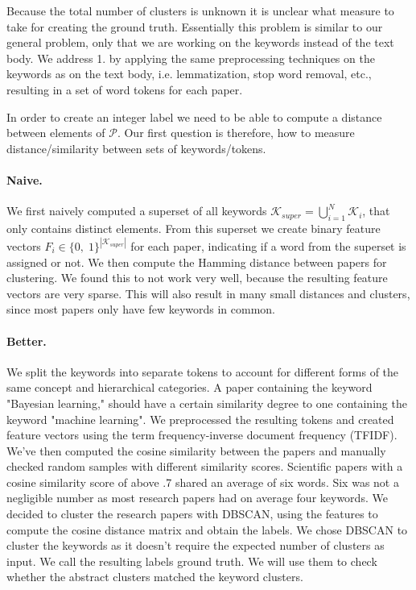 Because the total number of clusters is unknown it is unclear what measure to take for creating the ground truth. Essentially this problem is similar to our general problem, only that we are working on the keywords instead of the text body. We address 1. by applying the same preprocessing techniques on the keywords as on the text body, i.e. lemmatization, stop word removal, etc., resulting in a set of word tokens for each paper.

In order to create an integer label we need to be able to compute a distance between elements of $ \mathcal{P} $. Our first question is therefore, how to measure distance/similarity between sets of keywords/tokens. 

\paragraph{Naive.}
We first naively computed a superset of all keywords $ \mathcal{K}_{super} = \bigcup_{i=1}^{N} \mathcal{K}_{i} $, that only contains distinct elements. From this superset we create binary feature vectors $ F_{i} \in \{0,\; 1 \}^{|\mathcal{K}_{super}|} $ for each paper, indicating if a word from the superset is assigned or not. We then compute the Hamming distance between papers for clustering. We found this to not work very well, because the resulting feature vectors are very sparse. This will also result in many small distances and clusters, since most papers only have few keywords in common. 

\paragraph{Better.}
We split the keywords into separate tokens to account for different forms of the same concept and hierarchical categories. A paper containing the keyword "Bayesian learning," should have a certain similarity degree to one containing the keyword "machine learning". We preprocessed the resulting tokens and created feature vectors using the term frequency-inverse document frequency (TFIDF). We've then computed the cosine similarity between the papers and manually checked random samples with different similarity scores. Scientific papers with a cosine similarity score of above .7 shared an average of six words. Six was not a negligible number as most research papers had on average four keywords. We decided to cluster the research papers with DBSCAN, using the features to compute the cosine distance matrix and obtain the labels. We chose DBSCAN to cluster the keywords as it doesn't require the expected number of clusters as input. We call the resulting labels ground truth. We will use them to check whether the abstract clusters matched the keyword clusters. 

